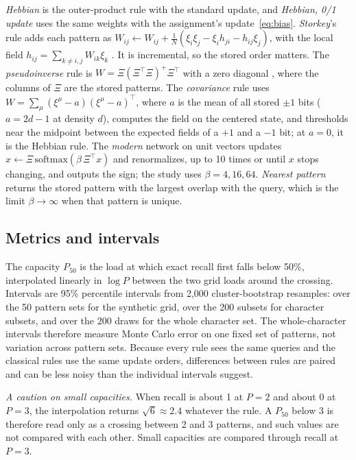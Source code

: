 \emph{Hebbian} is the outer-product rule with the standard update, and \emph{Hebbian, 0/1 update} uses the same weights with the assignment's update~\eqref{eq:bias}. \emph{Storkey}'s rule adds each pattern as $W_{ij} \leftarrow W_{ij} + \frac{1}{N}(\xi_i\xi_j - \xi_i h_{ji} - h_{ij}\xi_j)$, with the local field $h_{ij} = \sum_{k \neq i,j} W_{ik}\xi_k$ \cite{storkey1997}. It is incremental, so the stored order matters. The \emph{pseudoinverse} rule is $W = \Xi(\Xi^\top \Xi)^{+}\Xi^\top$ with a zero diagonal \cite{personnaz1985,kanter1987}, where the columns of $\Xi$ are the stored patterns. The \emph{covariance} rule \cite{amit1987} uses $W = \sum_\mu (\xi^\mu - a)(\xi^\mu - a)^\top$, where $a$ is the mean of all stored $\pm 1$ bits ($a = 2d - 1$ at density $d$), computes the field on the centered state, and thresholds near the midpoint between the expected fields of a $+1$ and a $-1$ bit; at $a = 0$, it is the Hebbian rule. The \emph{modern} network \cite{ramsauer2021} on unit vectors updates $x \leftarrow \Xi\,\mathrm{softmax}(\beta\,\Xi^\top x)$ and renormalizes, up to 10 times or until $x$ stops changing, and outputs the sign; the study uses $\beta = 4, 16, 64$. \emph{Nearest pattern} returns the stored pattern with the largest overlap with the query, which is the limit $\beta \to \infty$ when that pattern is unique.

\subsection{Metrics and intervals}

The capacity $P_{50}$ is the load at which exact recall first falls below 50\%, interpolated linearly in $\log P$ between the two grid loads around the crossing. Intervals are 95\% percentile intervals from 2,000 cluster-bootstrap resamples: over the 50 pattern sets for the synthetic grid, over the 200 subsets for character subsets, and over the 200 draws for the whole character set. The whole-character intervals therefore measure Monte Carlo error on one fixed set of patterns, not variation across pattern sets. Because every rule sees the same queries and the classical rules use the same update orders, differences between rules are paired and can be less noisy than the individual intervals suggest.

\emph{A caution on small capacities.} When recall is about 1 at $P = 2$ and about 0 at $P = 3$, the interpolation returns $\sqrt{6} \approx 2.4$ whatever the rule. A $P_{50}$ below 3 is therefore read only as a crossing between 2 and 3 patterns, and such values are not compared with each other. Small capacities are compared through recall at $P = 3$.
